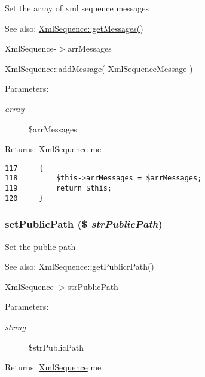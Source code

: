 Set the array of xml sequence messages

\begin{Desc}
\item[See also:]\hyperlink{class_xml_sequence_7347b0b89cca1d7604e93f5b5e896fc4}{XmlSequence::getMessages()} 

XmlSequence-$>$arrMessages 

XmlSequence::addMessage( XmlSequenceMessage ) \end{Desc}
\begin{Desc}
\item[Parameters:]
\begin{description}
\item[{\em array}]\$arrMessages \end{description}
\end{Desc}
\begin{Desc}
\item[Returns:]\hyperlink{class_xml_sequence}{XmlSequence} me \end{Desc}


\begin{Code}\begin{verbatim}117     {
118         $this->arrMessages = $arrMessages;
119         return $this;
120     }
\end{verbatim}
\end{Code}


\hypertarget{class_xml_sequence_261f2bb173e655f2ead64eda4c29e76a}{
\subsubsection[{setPublicPath}]{\setlength{\rightskip}{0pt plus 5cm}setPublicPath (\$ {\em strPublicPath})}}
\label{class_xml_sequence_261f2bb173e655f2ead64eda4c29e76a}


Set the \hyperlink{namespacepublic}{public} path

\begin{Desc}
\item[See also:]XmlSequence::getPublicrPath() 

XmlSequence-$>$strPublicPath \end{Desc}
\begin{Desc}
\item[Parameters:]
\begin{description}
\item[{\em string}]\$strPublicPath \end{description}
\end{Desc}
\begin{Desc}
\item[Returns:]\hyperlink{class_xml_sequence}{XmlSequence} me \end{Desc}


